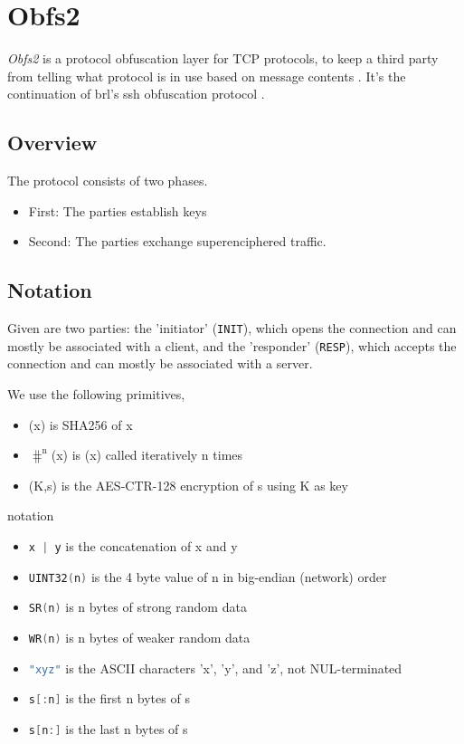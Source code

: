 \documentclass[sigconf, screen]{acmart}
\begin{document}
\section{Obfs2}
\label{s:obfs2}
\textit{Obfs2} is a protocol obfuscation layer for TCP protocols, to keep a third party from telling what protocol is in use based on message contents \cite{TorGitWebObfs2Specification}. It's the continuation of brl's ssh obfuscation protocol \cite{TorGitWebObfs2Specification} \cite{GitHubBrlObfuscatedOpenssh}.
\subsection{Overview}
\label{ss:overview}
The protocol consists of two phases.
\begin{itemize}
    \item First: The parties establish keys
    \item Second: The parties exchange superenciphered traffic.
\end{itemize}
\subsection{Notation}
\label{ss:notation}
Given are two parties: the 'initiator' (\lstinline[language=C]{INIT}), which opens the connection and can mostly be associated with a client, and the 'responder' (\lstinline[language=C]{RESP}), which accepts the connection and can mostly be associated with a server.

We use the following primitives,
\begin{itemize}
    \item \hash(x) is SHA256 of x
    \item $\mathrm{\hash^{n}}$(x) is \hash(x) called iteratively n times
    \item \enc(K,s) is the AES-CTR-128 encryption of s using K as key
\end{itemize}

notation
\begin{itemize}
    \item \lstinline[language=C]{x | y} is the concatenation of x and y
    \item \lstinline[language=C]{UINT32(n)} is the 4 byte value of n in big-endian (network) order
    \item \lstinline[language=C]{SR(n)} is n bytes of strong random data
    \item \lstinline[language=C]{WR(n)} is n bytes of weaker random data
    \item \lstinline[language=C]{"xyz"} is the ASCII characters 'x', 'y', and 'z', not NUL-terminated
    \item \lstinline[language=C]{s[:n]} is the first n bytes of s
    \item \lstinline[language=C]{s[n:]} is the last n bytes of s
\end{itemize}
\end{document}
